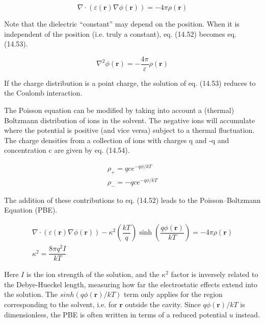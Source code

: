 \begin{equation}
\nabla\cdot(\varepsilon(\mathbf{r})\nabla\phi(\mathbf{r}))=-4\pi\rho(\mathbf{r})
\end{equation}


Note that the dielectric “constant” may depend on the position. When
it is independent of the position (i.e. truly a constant), eq. (14.52)
becomes eq. (14.53).

\begin{equation}
\nabla^{2}\phi(\mathbf{r})=-\frac{4\pi}{\varepsilon}\rho(\mathbf{r})
\end{equation}


If the charge distribution is a point charge, the solution of eq.
(14.53) reduces to the Coulomb interaction. 

The Poisson equation can be modified by taking into account a (thermal)
Boltzmann distribution of ions in the solvent. The negative ions will
accumulate where the potential is positive (and vice versa) subject
to a thermal fluctuation. The charge densities from a collection of
ions with charges q and -q and concentration c are given by eq. (14.54).

\begin{equation}
\begin{array}{c}
\rho_{+}=qce^{-q\phi/kT}\\
\rho_{-}=-qce^{-q\phi/kT}
\end{array}
\end{equation}


The addition of these contributions to eq. (14.52) leads to the Poisson–Boltzmann
Equation (PBE).

\begin{equation}
\begin{array}{r}
\nabla\cdot(\varepsilon(\mathbf{r})\nabla\phi(\mathbf{r}))-\kappa^{2}\left(\dfrac{kT}{q}\right)\sinh\left(\dfrac{q\phi(\mathbf{r})}{kT}\right)=-4\pi\rho(\mathbf{r})\\
\kappa^{2}=\dfrac{8\pi q^{2}I}{kT}
\end{array}
\end{equation}


Here $I$ is the ion strength of the solution, and the $\kappa^{2}$
factor is inversely related to the Debye-Hueckel length, measuring
how far the electrostatic effects extend into the solution. The $sinh(q\phi(\mathbf{r})/kT)$
term only applies for the region corresponding to the solvent, i.e.
for \textbf{$\mathbf{r}$} outside the cavity. Since $q\phi(\mathbf{r})/kT$
is dimensionless, the PBE is often written in terms of a reduced potential
$u$ instead.

